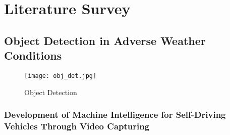 \chapter{Literature Survey}

\section{Object Detection in Adverse Weather Conditions}

\begin{figure}[h]
	\centering
	\texttt{[image: obj\_det.jpg]}
	\caption{Object Detection}
	\label{fig: img2}
\end{figure}

\subsection{Development of Machine Intelligence for Self-Driving Vehicles Through Video Capturing}
